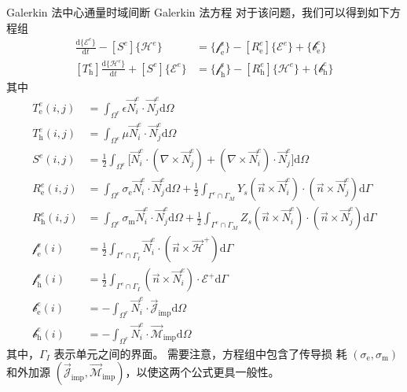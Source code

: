 \begin{theorem}{Galerkin 法}{中心通量时域间断 Galerkin 法方程}
    对于该问题，我们可以得到如下方程组
    \begin{align}
        [T^e_{\text{e}}]\frac{\text{d}\{\mathscr{E}^e\}}{\text{d}t}
        -[S^e]\{\mathscr{H}^e\}
        &=\{\mathscr{f}^e_\text{e}\}
        -[R^e_{\text{e}}]\{\mathscr{E}^e\}
        +\{\mathscr{b}^e_\text{e}\}\\
        [T^e_{\text{h}}]\frac{\text{d}\{\mathscr{H}^e\}}{\text{d}t}
        +[S^e]\{\mathscr{E}^e\}
        &=\{\mathscr{f}^e_\text{h}\}
        -[R^e_{\text{h}}]\{\mathscr{H}^e\}
        +\{\mathscr{b}^e_\text{h}\}
    \end{align}
    其中
    \begin{align}
        T^e_{\text{e}}(i,j)&=
        \int_{\Omega^e}\epsilon\vec{N}_i^e\cdot\vec{N}_j^e\text{d}\Omega\\
        T^e_{\text{h}}(i,j)&=
        \int_{\Omega^e}\mu\vec{N}_i^e\cdot\vec{N}_j^e\text{d}\Omega\\
        S^e(i,j)&=
        \frac{1}{2}\int_{\Omega^e}
        \Big[
            \vec{N}_i^e\cdot(\nabla\times\vec{N}_j^e)
            +(\nabla\times\vec{N}_i^e)\cdot\vec{N}_j^e
        \Big]
        \text{d}\Omega\\
        R^e_{\text{e}}(i,j)&=
        \int_{\Omega^e}\sigma_{\text{e}}\vec{N}_i^e\cdot\vec{N}_j^e\text{d}\Omega
        +\frac{1}{2}\int_{\Gamma^e\cap\Gamma_M}
        Y_s(\vec{n}\times\vec{N}_i^e)\cdot(\vec{n}\times\vec{N}_j^e)\text{d}\Gamma\\
        R^e_{\text{h}}(i,j)&=
        \int_{\Omega^e}\sigma_{\text{m}}\vec{N}_i^e\cdot\vec{N}_j^e\text{d}\Omega
        +\frac{1}{2}\int_{\Gamma^e\cap\Gamma_M}
        Z_s(\vec{n}\times\vec{N}_i^e)\cdot(\vec{n}\times\vec{N}_j^e)\text{d}\Gamma\\
        \mathscr{f}^e_\text{e}(i)&=
        \frac{1}{2}\int_{\Gamma^e\cap\Gamma_I}
        \vec{N}_i^e\cdot(\vec{n}\times\vec{\mathscr{H}}^+)\text{d}\Gamma\\
        \mathscr{f}^e_\text{h}(i)&=
        \frac{1}{2}\int_{\Gamma^e\cap\Gamma_I}
        (\vec{n}\times\vec{N}_i^e)\cdot\mathscr{E}^+\text{d}\Gamma\\
        \mathscr{b}^e_\text{e}(i)&=
        -\int_{\Omega^e}\vec{N}_i^e\cdot
        \vec{\mathscr{J}}_{\text{imp}}\text{d}\Omega\\
        \mathscr{b}^e_\text{h}(i)&=
        -\int_{\Omega^e}\vec{N}_i^e\cdot
        \vec{\mathscr{M}}_{\text{imp}}\text{d}\Omega
    \end{align}
    其中，$\Gamma_I$ 表示单元之间的界面。
    需要注意，方程组中包含了传导损
    耗 $(\sigma_{\text{e}},\sigma_{\text{m}})$ 
    和外加源 $(\vec{\mathscr{J}}_{\text{imp}},
    \vec{\mathscr{M}}_{\text{imp}})$，以使这两个公式更具一般性。
\end{theorem}

